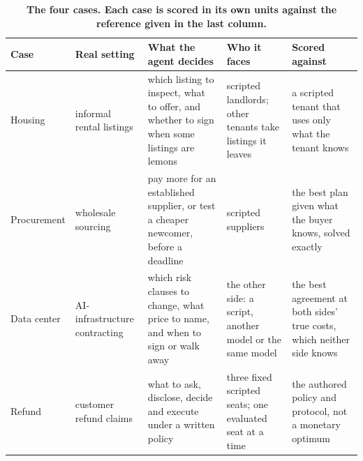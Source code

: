 \renewcommand{\thetable}{5.1}
\begin{longtable}[]{@{}
  >{\raggedright\arraybackslash}p{}
  >{\raggedright\arraybackslash}p{}
  >{\raggedright\arraybackslash}p{}
  >{\raggedright\arraybackslash}p{}
  >{\raggedright\arraybackslash}p{}@{}}
\caption{\textbf{The four cases. Each case is scored in its own units against the reference given in the last column.}}\label{tab:5.1}\tabularnewline
\toprule\noalign{}
\begin{minipage}[b]{\linewidth}\raggedright
Case
\end{minipage} & \begin{minipage}[b]{\linewidth}\raggedright
Real setting
\end{minipage} & \begin{minipage}[b]{\linewidth}\raggedright
What the agent decides
\end{minipage} & \begin{minipage}[b]{\linewidth}\raggedright
Who it faces
\end{minipage} & \begin{minipage}[b]{\linewidth}\raggedright
Scored against
\end{minipage} \\
\midrule\noalign{}
\endhead
\bottomrule\noalign{}
\endlastfoot
Housing & informal rental listings & which listing to inspect, what to offer, and whether to sign when some listings are lemons & scripted landlords; other tenants take listings it leaves & a scripted tenant that uses only what the tenant knows \\
Procurement & wholesale sourcing & pay more for an established supplier, or test a cheaper newcomer, before a deadline & scripted suppliers & the best plan given what the buyer knows, solved exactly \\
Data center & AI-infrastructure contracting & which risk clauses to change, what price to name, and when to sign or walk away & the other side: a script, another model or the same model & the best agreement at both sides' true costs, which neither side knows \\
Refund & customer refund claims & what to ask, disclose, decide and execute under a written policy & three fixed scripted seats; one evaluated seat at a time & the authored policy and protocol, not a monetary optimum \\
\end{longtable}

